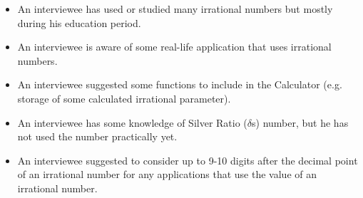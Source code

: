 \documentclass[12pt, letterpaper]{article}
\begin{document}
\begin{itemize}
	\item An interviewee has used or studied many irrational numbers but mostly during his education period.\par

	\item An interviewee is aware of some real-life application that uses irrational numbers.\par

	\item An interviewee suggested some functions to include in the Calculator (e.g. storage of some calculated irrational parameter).\par

	\item An interviewee has some knowledge of Silver Ratio ($ \delta $s) number, but he has not used the number practically yet.\par

	\item An interviewee suggested to consider up to 9-10 digits after the decimal point of an irrational number for any applications that use the value of an irrational number.
\end{itemize}\par

\printbibliography
\end{document}
